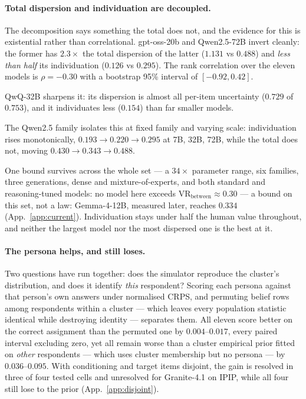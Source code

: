 \documentclass[11pt]{article}
\begin{document}
\paragraph{Total dispersion and individuation are decoupled.} The decomposition
says something the total does not, and the evidence for this is existential
rather than correlational. gpt-oss-20b and Qwen2.5-72B invert cleanly: the
former has $2.3\times$ the total dispersion of the latter ($1.131$ vs $0.488$)
and \emph{less than half} its individuation ($0.126$ vs $0.295$). The rank
correlation over the eleven models is $\rho=-0.30$ with a bootstrap 95\%
interval of $[-0.92,0.42]$.

QwQ-32B sharpens it: its dispersion is almost all per-item uncertainty ($0.729$
of $0.753$), and it individuates less ($0.154$) than far smaller models.

The Qwen2.5 family isolates this at fixed family and varying scale:
individuation rises monotonically, $0.193 \to 0.220 \to 0.295$ at 7B, 32B, 72B,
while the total does not, moving $0.430 \to 0.343 \to 0.488$.

One bound survives across the whole set --- a $34\times$ parameter range, six
families, three generations, dense and mixture-of-experts, and both standard and
reasoning-tuned models: no model here exceeds
$\mathrm{VR}_\text{between}\approx0.30$ --- a bound on this set, not a law:
Gemma-4-12B, measured later, reaches $0.334$ (App.~\ref{app:current}).
Individuation stays under half the human
value throughout, and neither the largest model nor the most dispersed one is
the best at it.

\paragraph{The persona helps, and still loses.} Two questions have run together:
does the simulator reproduce the cluster's distribution, and does it identify
\emph{this} respondent? Scoring each persona against that person's own answers
under normalised CRPS, and permuting belief rows among respondents within a
cluster --- which leaves every population statistic identical while destroying
identity --- separates them. All eleven score better on the correct assignment
than the permuted one by $0.004$--$0.017$, every paired interval excluding zero,
yet all remain worse than a cluster empirical prior fitted on \emph{other}
respondents --- which uses cluster membership but no persona --- by
$0.036$--$0.095$. With conditioning and target items disjoint, the gain is
resolved in three of four tested cells and unresolved for Granite-4.1 on IPIP,
while all four still lose to the prior (App.~\ref{app:disjoint}).
\end{document}
